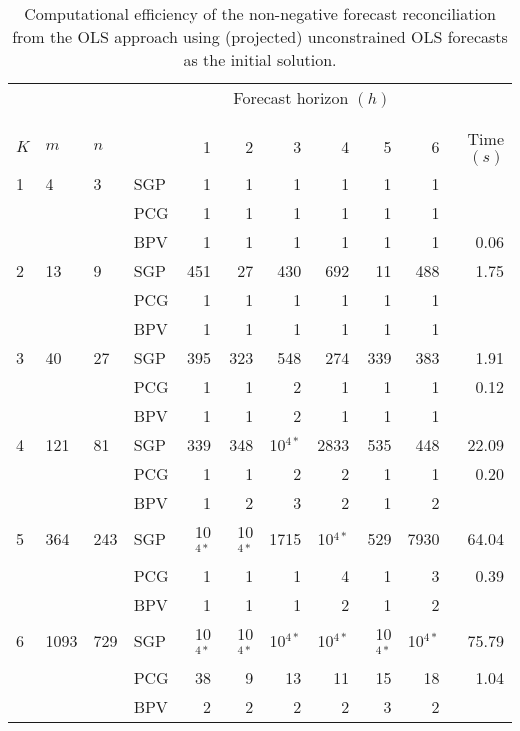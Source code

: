 \documentclass[11pt]{article}
\newcommand{\0}{\phantom{0}}
\begin{document}
\begin{table}[ht]
	\small
	\tabcolsep=0.20cm
	\caption{Computational efficiency of the non-negative forecast reconciliation from the OLS approach using (projected) unconstrained OLS forecasts as the initial solution.}
	\label{tbl:perfnnolsp}
	\centering
	\begin{threeparttable}
		\begin{tabular}{llllrrrrrrr}
			\toprule
			& & & & \multicolumn{6}{c}{Forecast horizon $(h)$}\\[-0.4cm]\\\cline{5-10}\\[-0.3cm]
			$K$ & $m$ & $n$ & & 1 & 2 & 3 & 4 & 5 & 6 & Time $(s)$\\ 
			\midrule
			1 & 4 & 3 & SGP & 1 & 1 & 1 & 1 & 1 & 1 & \pmb{0.03} \\
			& & & PCG & 1 & 1 & 1 & 1 & 1 & 1 & \pmb{0.03} \\
			& & & BPV & 1 & 1 & 1 & 1 & 1 & 1 & 0.06 \\
			\midrule
			2 & 13 & 9 & SGP & 451 & 27 & 430 & 692 & 11 & 488 & 1.75 \\			
			& & & PCG & 1 & 1 & 1 & 1 & 1 & 1 & \pmb{$0.07$} \\
			& & & BPV & 1 & 1 & 1 & 1 & 1 & 1 & \pmb{$0.07$} \\
			\midrule
			3 & 40 & 27 & SGP & 395 & 323 & 548 & 274 & 339 & 383 & 1.91 \\
			& & & PCG & 1 & 1 & 2 & 1 & 1 & 1 & 0.12 \\	
			& & & BPV & 1 & 1 & 2 & 1 & 1 & 1 & \pmb{$0.09$} \\
			\midrule		
			4 & 121 & 81 & SGP & 339 & 348 & 10$^{4*}$ & 2833 & 535 & 448 & 22.09\\
			& & & PCG & 1 & 1 & 2 & 2 & 1 & 1 & 0.20 \\
			& & & BPV & 1 & 2 & 3 & 2 & 1 & 2 & \pmb{$0.12$} \\
			\midrule
			5 & 364 & 243 & SGP & 10$^{4*}$ & 10$^{4*}$ & 1715 & 10$^{4*}$ & 529 & 7930 & 64.04 \\
			& & & PCG & 1 & 1 & 1 & 4 & 1 & 3 & 0.39 \\	
			& & & BPV & 1 & 1 & 1 & 2 & 1 & 2 & \pmb{$0.12$} \\ 
			\midrule		
			6 & 1093 & 729 & SGP & 10$^{4*}$ & 10$^{4*}$ & 10$^{4*}$ & 10$^{4*}$ & 10$^{4*}$ & 10$^{4*}$ & 75.79\\
			& & & PCG & 38 & 9 & 13 & 11 & 15 & 18 & 1.04 \\
			& & & BPV & 2 & 2 & 2 & 2 & 3 & 2 & \pmb{$0.19$} \\

\end{tabular}
\end{threeparttable}
\end{table}
\end{document}

